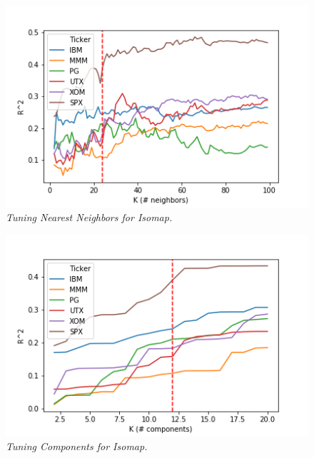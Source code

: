 \documentclass[a4paper]{article}
\begin{document}
    \begin{figure}[t]
    	\centering
    	\includegraphics[width=\linewidth]{isomap_knn_tune.png}
    	\caption{{\it Tuning Nearest Neighbors for Isomap.}}
    	\label{fig:IsomapKNNTuning}
    \end{figure}
    
    \begin{figure}[t]
    	\centering
    	\includegraphics[width=\linewidth]{isomap_tune.png}
    	\caption{{\it Tuning Components for Isomap.}}
    	\label{fig:IsomapComponentTuning}
    \end{figure}
    
\end{document}
